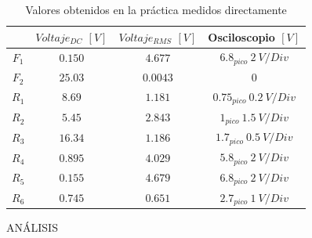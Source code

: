 \documentclass[twocolumn]{IEEEtran}
\begin{document}
\begin{table}[H]
	\centering
\begin{tabular}[c]{|c||c|c|c|} \hline
 & $Voltaje_{DC}$ $[V]$ & $Voltaje_{RMS}$ $[V]$ & Osciloscopio $[V]$\\ \hline
$F_1$ & $0.150$ & $4.677$ & $6.8_{pico} \ 2\ V/Div$ \\ \hline
$F_2$ & $25.03$ & $0.0043$ & $0$ \\ \hline
$R_1$ & $8.69$ & $1.181$ & $0.75_{pico} \ 0.2\ V/Div$ \\ \hline
$R_2$ & $5.45$ & $2.843$ & $1_{pico} \ 1.5\ V/Div$ \\ \hline
$R_3$ & $16.34$ & $1.186$ & $1.7_{pico} \ 0.5\ V/Div$ \\ \hline
$R_4$ & $0.895$ & $4.029$ & $5.8_{pico} \ 2\ V/Div$ \\ \hline
$R_5$ & $0.155$ & $4.679$ & $6.8_{pico} \ 2\ V/Div$ \\ \hline
$R_6$ & $0.745$ & $0.651$ & $2.7_{pico} \ 1\ V/Div$ \\ \hline
\end{tabular}
	\caption{Valores obtenidos en la práctica medidos directamente}
	\label{tab5}
\end{table}
\noindent
ANÁLISIS
\end{document}
